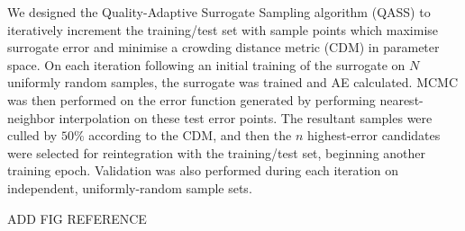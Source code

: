 We designed the Quality-Adaptive Surrogate Sampling algorithm (QASS) to iteratively increment the training/test set with sample points which maximise surrogate error and minimise a crowding distance metric (CDM) \cite{Solonen2012} in parameter space. On each iteration following an initial training of the surrogate on $N$ uniformly random samples, the surrogate was trained and AE calculated. MCMC was then performed on the error function generated by performing nearest-neighbor interpolation on these test error points. The resultant samples were culled by $50\%$ according to the CDM, and then the $n$ highest-error candidates were selected for reintegration with the training/test set, beginning another training epoch. Validation was also performed during each iteration on independent, uniformly-random sample sets.

ADD FIG REFERENCE




